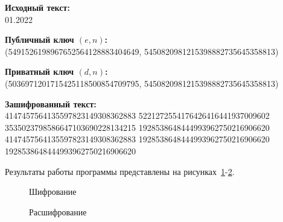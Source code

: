\textbf{Исходный текст:} \\
    01.2022

\textbf{Публичный ключ $(e, n)$:} \\
    (5491526198967652564128883404649, 5450820981215398882735645358813)

\textbf{Приватный ключ $(d, n)$:} \\
    (5036971201715425118500854709795, 5450820981215398882735645358813)

\textbf{Зашифрованный текст:} \\
    4147457564135597823149308362883 5221272554176426416441937009602
    3535023798586647103690228134215 1928538648444993962750216906620
    4147457564135597823149308362883 1928538648444993962750216906620
    1928538648444993962750216906620 

Результаты работы программы представлены на рисунках~\ref{ris:encode-test-3}-\ref{ris:decode-test-3}.

\vspace{\baselineskip}
\begin{figure}[H]
    \caption{Шифрование}
\label{ris:encode-test-3}
\end{figure}

\vspace{\baselineskip}
\begin{figure}[H]
    \caption{Расшифрование}
\label{ris:decode-test-3}
\end{figure}
